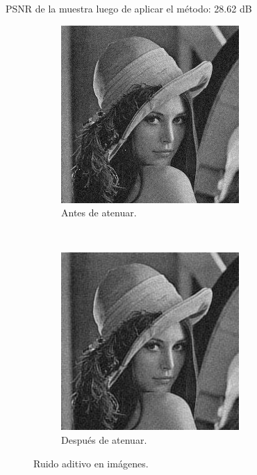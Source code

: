 \documentclass[a4paper,10pt,twoside]{article}
\begin{document}
PSNR de la muestra luego de aplicar el método: 28.62 dB


\begin{figure}[H]
  \centering
  \begin{subfigure}[b]{0.45\textwidth}
    \centering
    \includegraphics[width=\textwidth]{graficos/lena_aditivo_muestra.png}    
    \caption{Antes de atenuar.}
  \end{subfigure}
  ~ 
  \begin{subfigure}[b]{0.45\textwidth}
    \centering
    \includegraphics[width=\textwidth]{graficos/lena_aditivo_atenuar_muestra.png}
    \caption{Después de atenuar.}
  \end{subfigure}
  \caption{Ruido aditivo en imágenes.}
\end{figure}
\end{document}
